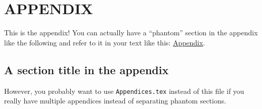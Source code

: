 
\chapter*{APPENDIX}
\label{chap:appendix}

This is the appendix! You can actually have a ``phantom'' section in the appendix like the following and refer to it in your text like this: \hyperref[sec:appendix_phantom_section]{Appendix}.

\section*{A section title in the appendix}
\label{sec:appendix_phantom_section}

However, you probably want to use \verb|Appendices.tex| instead of this file if you really have multiple appendices instead of separating phantom sections.
